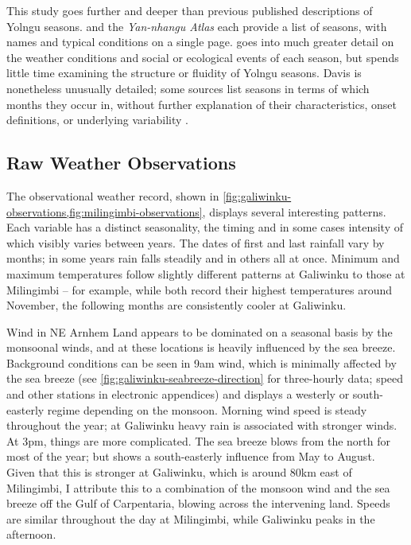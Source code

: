 This study goes further and deeper than previous published descriptions of Yolngu seasons.
\citet{barber2005} and the \textit{Yan-nhangu Atlas} \citep{atlas2014} each
provide a list of seasons, with names and typical conditions on a single page.
\citet{davis1989} goes into much greater detail on the weather conditions and
social or ecological events of each season, but spends little time examining
the structure or fluidity of Yolngu seasons.  Davis is nonetheless unusually
detailed; some sources \citep[eg.][]{BOM-iwk} list seasons in terms of which
months they occur in, without further explanation of their characteristics,
onset definitions, or underlying variability .


\subsection{Raw Weather Observations}
\label{ssec:disc-weather}

The observational weather record, shown in
\cref{fig:galiwinku-observations,fig:milingimbi-observations}, displays
several interesting patterns.  Each variable has a distinct seasonality,
the timing and in some cases intensity of which visibly varies between
years.  The dates of first and last rainfall vary by months; in some
years rain falls steadily and in others all at once.
%
Minimum and maximum temperatures follow slightly different patterns at
Galiwinku to those at Milingimbi -- for example, while both record their
highest temperatures around November, the following months are consistently
cooler at Galiwinku.

Wind in NE Arnhem Land appears to be dominated on a seasonal basis by the
monsoonal winds, and at these locations is heavily influenced by the sea
breeze.  Background conditions can be seen in 9am wind, which is minimally
affected by the sea breeze (see \cref{fig:galiwinku-seabreeze-direction}
for three-hourly data; speed and other stations in electronic appendices)
and displays a westerly or south-easterly regime depending on the monsoon.
Morning wind speed is steady throughout the year; at Galiwinku heavy rain
is associated with stronger winds.
%
At 3pm, things are more complicated.  The sea breeze blows from the north
for most of the year; but shows a south-easterly influence from May to
August.  Given that this is stronger at Galiwinku, which is around 80km
east of Milingimbi, I attribute this to a combination of the monsoon wind
and the sea breeze off the Gulf of Carpentaria, blowing across the intervening
land.  Speeds are similar throughout the day at Milingimbi, while Galiwinku
peaks in the afternoon.



